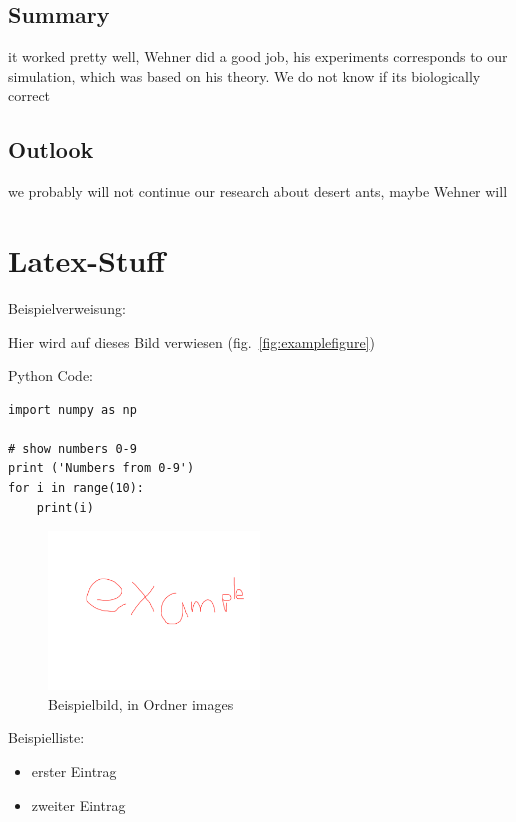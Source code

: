 \documentclass[11pt]{article}
\begin{document}
	\subsection{Summary}
		it worked pretty well, Wehner did a good job, his experiments corresponds to our simulation, which was based on his theory. We do not know if its biologically correct
	\subsection{Outlook}
		we probably will not continue our research about desert ants, maybe Wehner will

\section{Latex-Stuff}

Beispielverweisung:

Hier wird auf dieses Bild verwiesen (fig.~\vref{fig:examplefigure})

Python Code:
\begin{lstlisting}[caption=Python code example]
import numpy as np

# show numbers 0-9
print ('Numbers from 0-9')
for i in range(10):
	print(i)
\end{lstlisting}


\begin{figure}[h!]
	\includegraphics[width=0.5\textwidth]{example.png}
	\caption{Beispielbild, in Ordner images}
	\label{fig:examplefigure}
\end{figure}

Beispielliste:

\begin{itemize}
	\item erster Eintrag
	\item zweiter Eintrag
\end{itemize}
\end{document}
